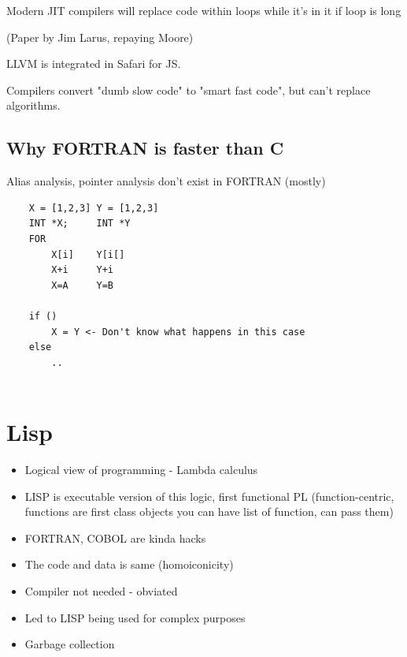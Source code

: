 \documentclass[twoside]{article}
\begin{document}
Modern JIT compilers will replace code within loops while it's in it if loop is long

(Paper by Jim Larus, repaying Moore)

LLVM is integrated in Safari for JS.

Compilers convert "dumb slow code" to "smart fast code", but can't replace algorithms.

\newpage

\subsection{Why FORTRAN is faster than C}

Alias analysis, pointer analysis don't exist in FORTRAN (mostly)

\begin{verbatim}
    X = [1,2,3] Y = [1,2,3]
    INT *X;     INT *Y
    FOR 
        X[i]    Y[i[]
        X+i     Y+i
        X=A     Y=B
    
    if ()
        X = Y <- Don't know what happens in this case
    else
        ..
    
\end{verbatim}

\section{Lisp}

\begin{itemize}
  \item Logical view of programming - Lambda calculus
  \item LISP is executable version of this logic, first functional PL (function-centric, functions are first class objects you can have list of function, can pass them)
  \item FORTRAN, COBOL are kinda hacks
  \item The code and data is same (homoiconicity)
  \item Compiler not needed - obviated
  \item Led to LISP being used for complex purposes
  \item Garbage collection
\end{itemize}
\end{document}
